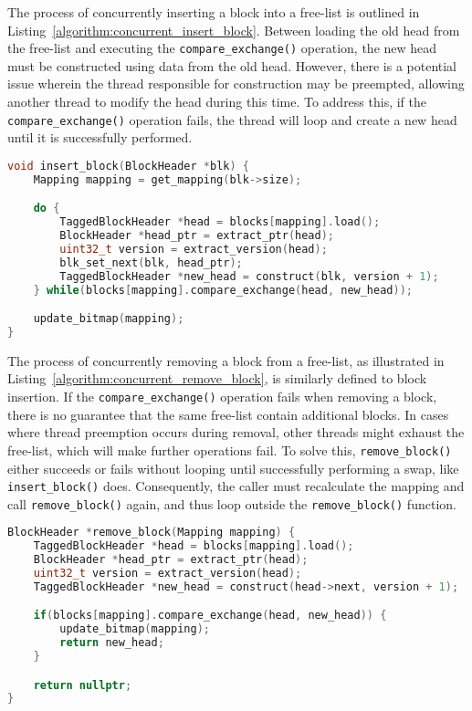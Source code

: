 The process of concurrently inserting a block into a free-list is outlined in Listing~\ref{algorithm:concurrent_insert_block}. Between loading the old head from the free-list and executing the \texttt{compare\_exchange()} operation, the new head must be constructed using data from the old head. However, there is a potential issue wherein the thread responsible for construction may be preempted, allowing another thread to modify the head during this time. To address this, if the \texttt{compare\_exchange()} operation fails, the thread will loop and create a new head until it is successfully performed.

\begin{lstlisting}[language=C++, caption={Concurrent insertion of a lock into the head of a free-list.}, label={algorithm:concurrent_insert_block}]
void insert_block(BlockHeader *blk) {
    Mapping mapping = get_mapping(blk->size);

    do {
        TaggedBlockHeader *head = blocks[mapping].load();
        BlockHeader *head_ptr = extract_ptr(head);
        uint32_t version = extract_version(head);
        blk_set_next(blk, head_ptr);
        TaggedBlockHeader *new_head = construct(blk, version + 1);
    } while(blocks[mapping].compare_exchange(head, new_head));

    update_bitmap(mapping);
}
\end{lstlisting}

The process of concurrently removing a block from a free-list, as illustrated in Listing~\ref{algorithm:concurrent_remove_block}, is similarly defined to block insertion. If the \texttt{compare\_exchange()} operation fails when removing a block, there is no guarantee that the same free-list contain additional blocks. In cases where thread preemption occurs during removal, other threads might exhaust the free-list, which will make further operations fail. To solve this, \texttt{remove\_block()} either succeeds or fails without looping until successfully performing a swap, like \texttt{insert\_block()} does. Consequently, the caller must recalculate the mapping and call \texttt{remove\_block()} again, and thus loop outside the \texttt{remove\_block()} function.

\begin{lstlisting}[language=C++, caption={Concurrent removal of the head of a free-list.}, label={algorithm:concurrent_remove_block}]
BlockHeader *remove_block(Mapping mapping) {
    TaggedBlockHeader *head = blocks[mapping].load();
    BlockHeader *head_ptr = extract_ptr(head);
    uint32_t version = extract_version(head);
    TaggedBlockHeader *new_head = construct(head->next, version + 1);

    if(blocks[mapping].compare_exchange(head, new_head)) {
        update_bitmap(mapping);
        return new_head;
    }

    return nullptr;
}
\end{lstlisting}


